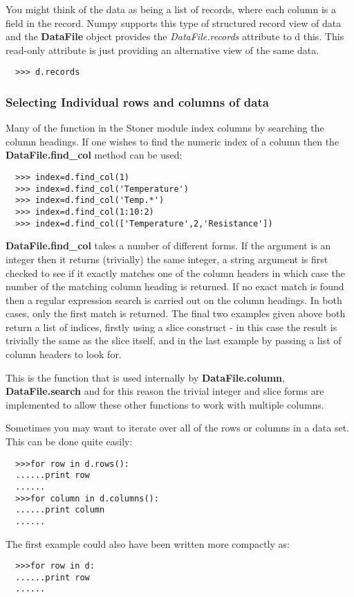 \documentclass[a4paper,11pt]{scrartcl}
\begin{document}
You might think of the data as being a list of records, where each column is a
field in the record. Numpy supports this type of structured record view of data
and the \textbf{DataFile} object provides the \textit{DataFile.records}
attribute to d this. This read-only attribute is just providing an alternative
view of the same data.

\begin{verbatim}
  >>> d.records
\end{verbatim}

\subsubsection{Selecting Individual rows and columns of data}

Many of the function in the Stoner module index columns by searching the column
headings. If one wishes to find the numeric index of a column then the
\textbf{DataFile.find\_col} method can be used:

\begin{verbatim}
  >>> index=d.find_col(1)
  >>> index=d.find_col('Temperature')
  >>> index=d.find_col('Temp.*')
  >>> index=d.find_col(1:10:2)
  >>> index=d.find_col(['Temperature',2,'Resistance'])
\end{verbatim}

 \textbf{DataFile.find\_col} takes a number of different forms. If the argument
is an integer then it returns (trivially) the same integer, a string argument is
first checked to see if it exactly matches one of the column headers in which
case the number of the matching column heading is returned. If no exact match is
found then a regular expression search is carried out on the column headings. In
both cases, only the first match is returned. The final two examples given above
both return a list of indices, firstly using a slice construct - in this case
the result is trivially the same as the slice itself, and in the last example by
passing a list of column headers to look for.

This is the function that is used internally by \textbf{DataFile.column},
\textbf{DataFile.search} \etc and for this reason the trivial integer and slice
forms are implemented to allow these other functions to work with multiple
columns.

Sometimes you may want to iterate over all of the rows or columns in a data set.
This can be done quite easily:
\begin{verbatim}
  >>>for row in d.rows():
  ......print row
  ......
  >>>for column in d.columns():
  ......print column
  ......
\end{verbatim}
The first example could also have been written more compactly as:
\begin{verbatim}
  >>>for row in d:
  ......print row
  ......
\end{verbatim}
\end{document}
